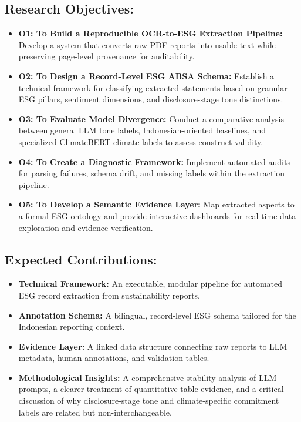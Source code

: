 \subsection{Research Objectives:}
\begin{itemize}
\item 

\textbf{O1: To Build a Reproducible OCR-to-ESG Extraction Pipeline:} Develop a system that converts raw PDF reports into usable text while preserving page-level provenance for auditability.\item 

\textbf{O2: To Design a Record-Level ESG ABSA Schema:} Establish a technical framework for classifying extracted statements based on granular ESG pillars, sentiment dimensions, and disclosure-stage tone distinctions.\item 

\textbf{O3: To Evaluate Model Divergence:} Conduct a comparative analysis between general LLM tone labels, Indonesian-oriented baselines, and specialized ClimateBERT climate labels to assess construct validity.\item 

\textbf{O4: To Create a Diagnostic Framework:} Implement automated audits for parsing failures, schema drift, and missing labels within the extraction pipeline.\item 

\textbf{O5: To Develop a Semantic Evidence Layer:} Map extracted aspects to a formal ESG ontology and provide interactive dashboards for real-time data exploration and evidence verification.
\end{itemize}
\subsection{Expected Contributions:}
\begin{itemize}
\item 

\textbf{Technical Framework:} An executable, modular pipeline for automated ESG record extraction from sustainability reports.\item 

\textbf{Annotation Schema:} A bilingual, record-level ESG schema tailored for the Indonesian reporting context.\item 

\textbf{Evidence Layer:} A linked data structure connecting raw reports to LLM metadata, human annotations, and validation tables.\item 

\textbf{Methodological Insights:} A comprehensive stability analysis of LLM prompts, a clearer treatment of quantitative table evidence, and a critical discussion of why disclosure-stage tone and climate-specific commitment labels are related but non-interchangeable.
\end{itemize}
